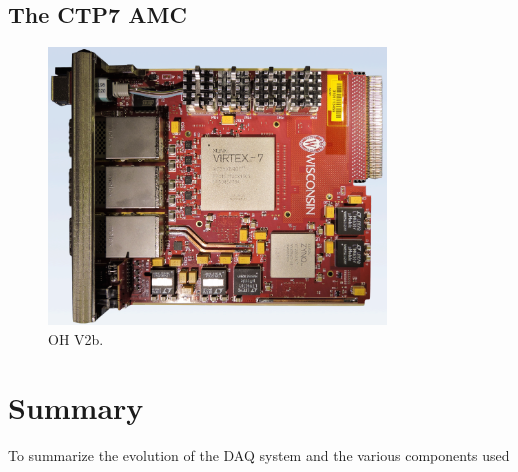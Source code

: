     \subsection{The CTP7 AMC}

      \begin{figure}[h!]
        \centering
        \includegraphics[width=0.8\textwidth]{img/II-2-daq/ctp7.png}
        \caption{OH V2b.}
        \label{fig:II-2-daq-ctp7}
      \end{figure}

  \section{Summary}

    To summarize the evolution of the DAQ system and the various components used

